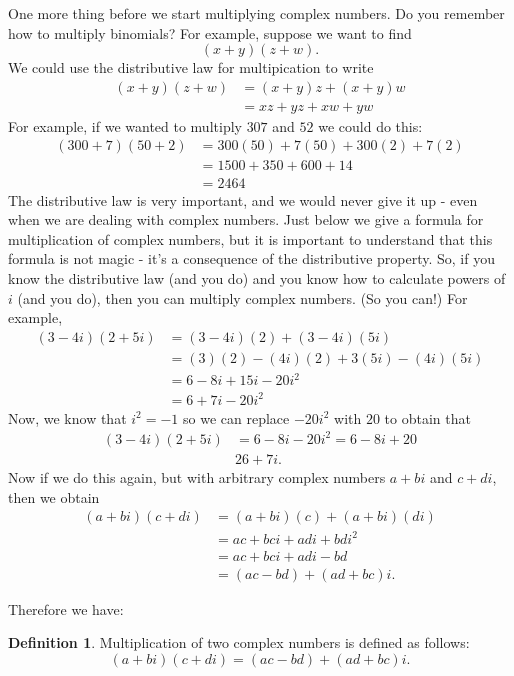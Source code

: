 \documentclass[11pt]{article}
\theoremstyle{definition}
\newtheorem{definition}[theorem]{Definition}
\begin{document}
One more thing before we start multiplying complex numbers. Do you remember how to multiply binomials? For example, suppose we want to find
\[ (x+y)(z+w).\]
We could use the distributive law for multipication to write
\begin{align*}
  (x+y)(z+w) &= (x+y)z + (x+y)w\\
             &= xz + yz + xw + yw
\end{align*}
For example, if we wanted to multiply $307$ and $52$ we could do this:
\begin{align*}
  (300+7)(50+2) &= 300(50) + 7(50) + 300(2) + 7(2)\\
                &= 1500 + 350 + 600 + 14\\
                &= 2464
\end{align*}
The distributive law is very important, and we would never give it up - even when we are dealing with complex numbers. Just below we give a formula for
multiplication of complex numbers, but it is important to understand that this formula is not magic - it's a consequence of the distributive property.
So, if you know the distributive law (and you do) and you know how to calculate powers of $i$ (and you do), then you can multiply complex numbers. (So you can!)
For example,
\begin{align*}
  (3-4i)(2+5i) &= (3-4i)(2) + (3-4i)(5i)\\
               &= (3)(2) - (4i)(2) + 3(5i)-(4i)(5i)\\
               &= 6 - 8i + 15i -20i^2\\
               &= 6 + 7i -20i^2
\end{align*}
Now, we know that $i^2= -1$ so we can replace $-20i^2$ with $20$ to obtain that
\begin{align*}
  (3-4i)(2+5i) &= 6-8i-20i^2 = 6-8i+20\\
               & 26 + 7i.
\end{align*}
Now if we do this again, but with arbitrary complex numbers $a+bi$ and $c+di$, then we obtain
\begin{align*}
  (a+bi)(c+di) &= (a+bi)(c)+(a+bi)(di)\\
               &= ac + bci + adi + bdi^2\\
               &= ac + bci + adi - bd\\
             &= (ac-bd)+(ad+bc)i.
\end{align*}

Therefore we have:

\begin{definition}
Multiplication of two complex numbers is defined as follows:
\[ (a+bi)(c+di) = (ac-bd) + (ad+bc)i.\]
\end{definition}
\end{document}
